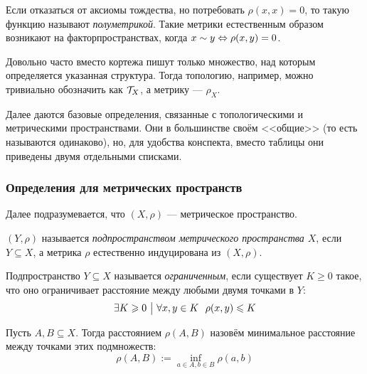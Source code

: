\begin{note}
	Если отказаться от аксиомы тождества, но потребовать $\rho(x, x) = 0$, то такую функцию называют \textit{полуметрикой}. Такие метрики естественным образом возникают на факторпространствах, когда $x \sim y \Leftrightarrow \rho(x, y) = 0$.
\end{note}

\begin{note}
	Довольно часто вместо кортежа пишут только множество, над которым определяется указанная структура. Тогда топологию, например, можно тривиально обозначить как $\mathcal{T}_X$, а метрику --- $\rho_X$.
\end{note}

\begin{anote}
	Далее даются базовые определения, связанные с топологическими и метрическими пространствами. Они в большинстве своём <<общие>> (то есть называются одинаково), но, для удобства конспекта, вместо таблицы они приведены двумя отдельными списками.
\end{anote}

\subsubsection*{Определения для метрических пространств}

\begin{note}
	Далее подразумевается, что $(X, \rho)$ --- метрическое пространство.
\end{note}

\begin{definition}
	$(Y, \rho)$ называется \textit{подпространством метрического пространства $X$}, если $Y \subseteq X$, а метрика $\rho$ естественно индуцирована из $(X, \rho)$.
\end{definition}

\begin{definition}
	Подпространство $Y \subseteq X$ называется \textit{ограниченным}, если существует $K \ge 0$ такое, что оно ограничивает расстояние между любыми двумя точками в $Y$:
	\[
		\exists K \ge 0 \such \forall x, y \in K\ \ \rho(x, y) \le K
	\]
\end{definition}

\begin{definition}
	Пусть $A, B \subseteq X$. Тогда расстоянием $\rho(A, B)$ назовём минимальное расстояние между точками этих подмножеств:
	\[
		\rho(A, B) := \inf_{a \in A, b \in B} \rho(a, b)
	\]
\end{definition}

